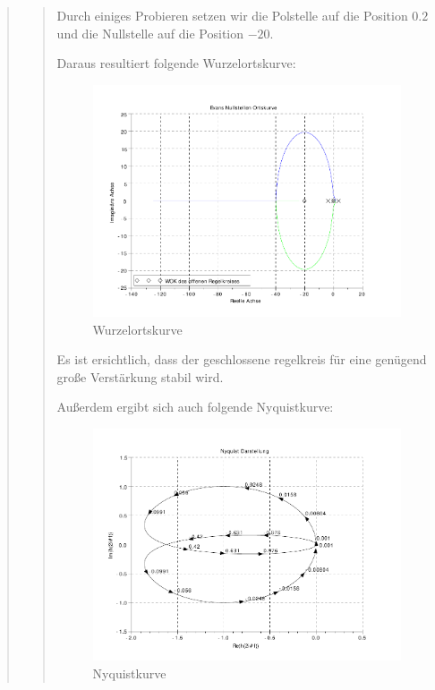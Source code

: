 \begin{quote}
\begin{quote}
        Durch einiges Probieren setzen wir die Polstelle auf die Position $0.2$ und die Nullstelle auf die Position
        $-20$.
        
        Daraus resultiert folgende Wurzelortskurve:
        
        \begin{figure}[H]
        \centering
            \includegraphics[scale=0.7, trim = 0cm 0cm 0cm 0cm, clip]{./Bilder/WOK}
                \caption{Wurzelortskurve}
        \end{figure}
        
        Es ist ersichtlich, dass der geschlossene regelkreis für eine genügend große Verstärkung stabil wird.\vspace{1em}
        
        Außerdem ergibt sich auch folgende Nyquistkurve:
        
        \begin{figure}[H]
        \centering
            \includegraphics[scale=0.7, trim = 0cm 0cm 0cm 0cm, clip]{./Bilder/Nyquistkurve}
                \caption{Nyquistkurve}
        \end{figure}
        

\end{quote}
\end{quote}
